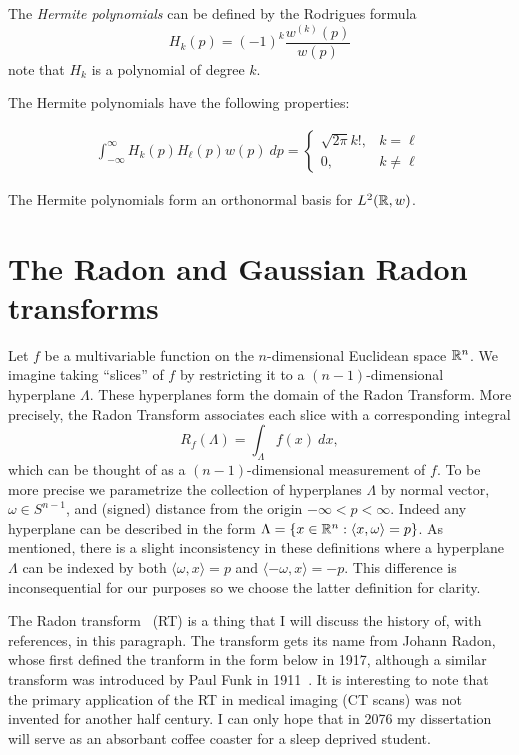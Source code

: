 \begin{definition}
  The \textit{Hermite polynomials} can be defined by the Rodrigues formula
  \[
      H_k(p) = {(-1)}^k \frac{w^{(k)}(p)}{w(p)}
  \]
  note that $H_k$ is a polynomial of degree $k$.
\end{definition}
The Hermite polynomials have the following properties:

\begin{align*}
  \int_{-\infty}^\infty H_k(p) H_\ell(p) w(p)~dp 
  = \begin{cases}
    \sqrt{2\pi} k!, & k = \ell \\
    0, & k \neq \ell
  \end{cases}
\end{align*}

The Hermite polynomials form an orthonormal basis for $L^2(\mathbb{R}, w)$.

\section{The Radon and Gaussian Radon transforms}

Let $f$ be a multivariable function on the $n$-dimensional Euclidean space $\mathbb{R}^n$. We imagine taking ``slices'' of $f$ by restricting it to a $(n-1)$-dimensional hyperplane $\Lambda$. These hyperplanes form the domain of the Radon Transform. More precisely, the Radon Transform associates each slice with a corresponding integral
\[
  R_f(\Lambda) = \int_{\Lambda} f(x) ~dx,
\]
which can be thought of as a $(n-1)$-dimensional measurement of $f$. To be more precise we parametrize the collection of hyperplanes $\Lambda$ by normal vector, $\omega \in S^{n-1}$, and (signed) distance from the origin $-\infty < p < \infty$. Indeed any hyperplane can be described in the form $\Lambda = \{x \in \mathbb{R}^n: \langle x, \omega\rangle = p\}$. As mentioned, there is a slight inconsistency in these definitions where a hyperplane $\Lambda$ can be indexed by both $\langle \omega, x \rangle = p$ and $\langle -\omega, x \rangle = -p$. This difference is inconsequential for our purposes so we choose the latter definition for clarity.

The Radon transform~\cite{Helg65} (RT) is a thing that I will discuss the history of, with references, in this paragraph. The transform gets its name from Johann Radon, whose first defined the tranform in the form below in 1917, although a similar transform was introduced by Paul Funk in 1911~\cite{????}. It is interesting to note that the primary application of the RT in medical imaging (CT scans) was not invented for another half century. I can only hope that in 2076 my dissertation will serve as an absorbant coffee coaster for a sleep deprived student.

